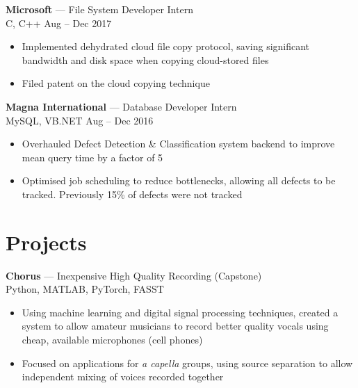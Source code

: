 \documentclass[letterpaper,10pt]{article}
\newcommand{\comment}[1]{}
\newcommand{\jobtitle}[4]{
    {\large \textbf{#1} --- #2\\}
    {\footnotesize#3 \hfill #4}
}
\begin{document}
\begin{minipage}[t]{0.6\textwidth}
\begin{itemize}
\comment{TODO: Impact statements. Double indented list?}

\end{itemize}
\bigskip

\jobtitle{Microsoft}{File System Developer Intern}{C, C++ }{Aug -- Dec 2017}
\begin{itemize}
    \item {Implemented dehydrated cloud file copy protocol, saving significant bandwidth and disk space when copying cloud-stored files}
    \item {Filed patent on the cloud copying technique}   %
\end{itemize}
\bigskip

\jobtitle{Magna International}{Database Developer Intern}{MySQL, VB.NET}{Aug -- Dec 2016}
\begin{itemize}
    \item {Overhauled Defect Detection \& Classification system backend to improve mean query time by a factor of 5}
    \item {Optimised job scheduling to reduce bottlenecks, allowing all defects to be tracked. Previously 15\% of defects were not tracked}
\end{itemize}
\bigskip

\section{Projects}
\smallskip
{\large
\textbf{Chorus} --- Inexpensive High Quality Recording (Capstone) \\
}
{\footnotesize
Python, MATLAB, PyTorch, FASST
}
\begin{itemize}
	\item {Using machine learning and digital signal processing techniques, created a system to allow amateur musicians to record better quality vocals using cheap, available microphones (cell phones)}
    \item {Focused on applications for \textit{a capella} groups, using source separation to allow independent mixing of voices recorded together}
\end{itemize}

\bigskip

\comment{todo: MHCT?}

\comment{
{\large
\textbf{UW Autonomous Sailboat Team}\\
}
{\footnotesize
Python
}
\begin{itemize}
	\item {Implemented autonomous path planning software for round-the-buoys races on a 2 metre model sailboat}
    \item {Created automatic sail trim system in hardware}
\end{itemize}
}

\end{minipage}
\end{document}
